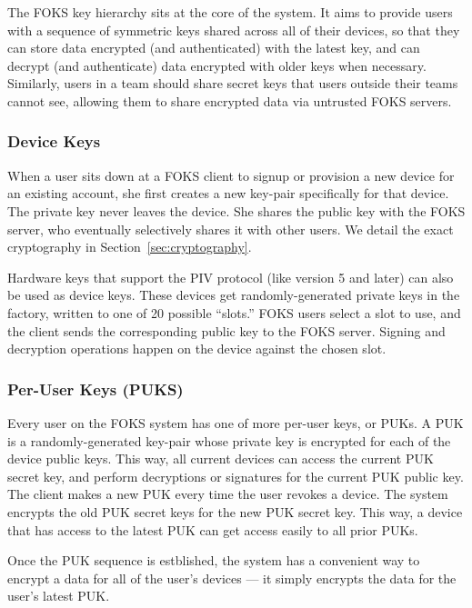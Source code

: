 The FOKS key hierarchy sits at the core of the system. It aims to provide users
with a sequence of symmetric keys shared across all of their devices, so that
they can store data encrypted (and authenticated) with the latest key, and can decrypt (and
authenticate) data encrypted with older keys when necessary. Similarly, users in
a team should share secret keys that users outside their teams cannot see, allowing
them to share encrypted data via untrusted FOKS servers.

\subsubsection{Device Keys}

When a user sits down at a FOKS client to signup or provision a new device
for an existing account, she first creates a new key-pair specifically
for that device. The private key never leaves the device. She shares the public key
with the FOKS server, who eventually selectively shares it with other users.
We detail the exact cryptography in Section~\ref{sec:cryptography}.

Hardware keys that support the PIV protocol (like \yubi{} version 5 and later)
can also be used as device keys. These devices get randomly-generated private
keys in the factory, written to one of 20 possible ``slots.'' FOKS users select
a slot to use, and the client sends the corresponding public key to the FOKS 
server. Signing and decryption operations happen on the device against the chosen
slot. 

\subsubsection{Per-User Keys (PUKS)}

Every user on the FOKS system has one of more per-user keys, or PUKs. A PUK
is a randomly-generated key-pair whose private key is encrypted for each of
the device public keys. This way, all current devices can access the current
PUK secret key, and perform decryptions or signatures for the current PUK public
key. The client makes a new PUK every time the user revokes a device. The system
encrypts the old PUK secret keys for the new PUK secret key. This way,
a device that has access to the latest PUK can get access easily to all prior
PUKs.

Once the PUK sequence is estblished, the system has a convenient way to encrypt
a data for all of the user's devices --- it simply encrypts the data for the 
user's latest PUK.

